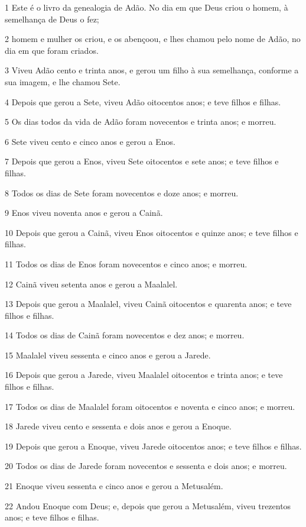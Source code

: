 \par 1 Este é o livro da genealogia de Adão. No dia em que Deus criou o homem, à semelhança de Deus o fez;
\par 2 homem e mulher os criou, e os abençoou, e lhes chamou pelo nome de Adão, no dia em que foram criados.
\par 3 Viveu Adão cento e trinta anos, e gerou um filho à sua semelhança, conforme a sua imagem, e lhe chamou Sete.
\par 4 Depois que gerou a Sete, viveu Adão oitocentos anos; e teve filhos e filhas.
\par 5 Os dias todos da vida de Adão foram novecentos e trinta anos; e morreu.
\par 6 Sete viveu cento e cinco anos e gerou a Enos.
\par 7 Depois que gerou a Enos, viveu Sete oitocentos e sete anos; e teve filhos e filhas.
\par 8 Todos os dias de Sete foram novecentos e doze anos; e morreu.
\par 9 Enos viveu noventa anos e gerou a Cainã.
\par 10 Depois que gerou a Cainã, viveu Enos oitocentos e quinze anos; e teve filhos e filhas.
\par 11 Todos os dias de Enos foram novecentos e cinco anos; e morreu.
\par 12 Cainã viveu setenta anos e gerou a Maalalel.
\par 13 Depois que gerou a Maalalel, viveu Cainã oitocentos e quarenta anos; e teve filhos e filhas.
\par 14 Todos os dias de Cainã foram novecentos e dez anos; e morreu.
\par 15 Maalalel viveu sessenta e cinco anos e gerou a Jarede.
\par 16 Depois que gerou a Jarede, viveu Maalalel oitocentos e trinta anos; e teve filhos e filhas.
\par 17 Todos os dias de Maalalel foram oitocentos e noventa e cinco anos; e morreu.
\par 18 Jarede viveu cento e sessenta e dois anos e gerou a Enoque.
\par 19 Depois que gerou a Enoque, viveu Jarede oitocentos anos; e teve filhos e filhas.
\par 20 Todos os dias de Jarede foram novecentos e sessenta e dois anos; e morreu.
\par 21 Enoque viveu sessenta e cinco anos e gerou a Metusalém.
\par 22 Andou Enoque com Deus; e, depois que gerou a Metusalém, viveu trezentos anos; e teve filhos e filhas.
